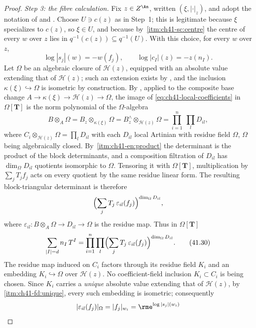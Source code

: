 \begin{proof}
\medskip
\noindent\emph{Step 3: the fibre calculation.}
Fix $z\in Z^{\An}$, written $(\xi,|\cdot|_z)$, and adopt the notation
of  and
.  Choose $U\ni c(z)$ as in Step~1;
this is legitimate because $\xi$ specializes to $c(z)$, so
$\xi\in U$, and because by
\,\cref{itm:ch41-sc:centre} the centre
of every $w$ over $z$ lies in $q^{-1}(c(z))\subseteq q^{-1}(U)$.
With this choice, for every $w$ over $z$,
\[
 \log|s_j|(w)=-w(f_j),
 \qquad
 \log|c_I|(z)=-z(n_I).
\tag{41.29}\label{eq:ch41-frame-values}
\]
Let $\Omega$ be an algebraic closure of $\mathcal H(z)$, equipped with
an absolute value extending that of $\mathcal H(z)$; such an extension
exists by \cite[Chapter~VI, \S4]{ZariskiSamuelII}, and the inclusion
$\kappa(\xi)\hookrightarrow\Omega$ is isometric by construction.  By
, applied to the composite base change
$A\to\kappa(\xi)\to\mathcal H(z)\to\Omega$, the image of
\eqref{eq:ch41-local-coefficients} in $\Omega[\mathbf T]$ is the norm
polynomial of the $\Omega$-algebra
\[
 B\otimes_A\Omega=B_z\otimes_{\kappa(\xi)}\Omega
 =B_z^{\wedge}\otimes_{\mathcal H(z)}\Omega
 =\prod_{i=1}^n\ \prod_{l}D_{il},
\]
where $C_i\otimes_{\mathcal H(z)}\Omega=\prod_lD_{il}$ with each
$D_{il}$ local Artinian with residue field $\Omega$, $\Omega$ being
algebraically closed.  By
\,\cref{itm:ch41-en:product} the determinant is
the product of the block determinants, and
a composition filtration of $D_{il}$ has
$\dim_\Omega D_{il}$ quotients isomorphic to $\Omega$.
Tensoring it with $\Omega[\mathbf T]$, multiplication by
$\sum_jT_jf_j$ acts on every quotient by the same residue linear form.
The resulting block-triangular determinant is therefore
\[
 \Bigl(\sum_jT_j\,\varepsilon_{il}(f_j)\Bigr)^{\dim_\Omega D_{il}},
\]
where $\varepsilon_{il}:B\otimes_A\Omega\to D_{il}\to\Omega$ is the
residue map.  Thus in $\Omega[\mathbf T]$
\[
 \sum_{|I|=d}n_I\,T^I
 =\prod_{i=1}^n\prod_l
 \Bigl(\sum_jT_j\,\varepsilon_{il}(f_j)\Bigr)^{\dim_\Omega D_{il}} .
\tag{41.30}\label{eq:ch41-norm-factorization}
\]
The residue map induced on $C_i$ factors through its residue
field $K_i$ and an embedding $K_i\hookrightarrow\Omega$
over $\mathcal H(z)$.  No coefficient-field inclusion
$K_i\subset C_i$ is being chosen.  Since $K_i$ carries
a \emph{unique} absolute value extending that of $\mathcal H(z)$, by
\,\cref{itm:ch41-fd:unique}, every such
embedding is isometric; consequently
\[
 |\varepsilon_{il}(f_j)|_\Omega=|f_j|_{w_i}=\rme^{\log|s_j|(w_i)}
\]
\end{proof}
